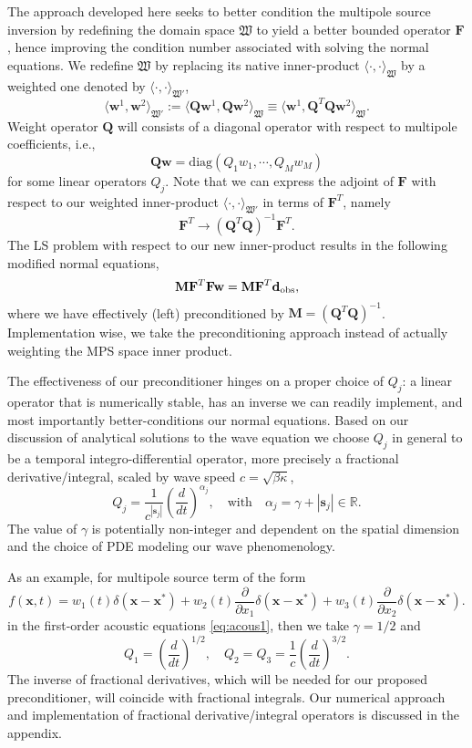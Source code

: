 The approach developed here seeks to better condition the multipole source inversion by redefining the domain space $\mathfrak W$ to yield a better bounded operator $\mathbf F$, hence improving the condition number associated with solving the normal equations.
We redefine $\mathfrak W$ by replacing its native inner-product $\langle\cdot,\cdot\rangle_{\mathfrak W}$ by a weighted one denoted by $\langle\cdot,\cdot\rangle_{\mathfrak W'}$,
\[
	\langle \mathbf w^1, \mathbf w^2 \rangle_{\mathfrak W'} := \langle \mathbf Q\mathbf w^1, \mathbf Q \mathbf w^2 \rangle_{\mathfrak W} \equiv \langle \mathbf w^1, \mathbf Q^T\mathbf Q \mathbf w^2 \rangle_{\mathfrak W}.
\] 
Weight operator $\mathbf Q$ will consists of a diagonal operator with respect to multipole coefficients, i.e.,
\[
	\mathbf Q \mathbf w = \text{diag}(Q_1 w_1, \cdots, Q_M w_M)
\]
for some linear operators $Q_j$.
Note that we can express the adjoint of $\mathbf F$ with respect to our weighted inner-product $\langle\cdot,\cdot\rangle_{\mathfrak W'}$ in terms of $\mathbf F^T$, namely
\[
	\mathbf F^T \to (\mathbf Q^T\mathbf Q)^{-1} \mathbf F^T.
\]
The LS problem with respect to our new inner-product results in the following modified normal equations,
\begin{equation}\label{eq:PNEQ}
	\mathbf M\mathbf F^T\mathbf F \mathbf w = \mathbf M\mathbf F^T \mathbf d_{\rm obs},
\end{equation}
where we have effectively (left) preconditioned by $\mathbf M = (\mathbf Q^T\mathbf Q)^{-1}$.
Implementation wise, we take the preconditioning approach instead of actually weighting the MPS space inner product.

The effectiveness of our preconditioner hinges on a proper choice of $Q_j$: a linear operator that is numerically stable, has an inverse we can readily implement, and most importantly better-conditions our normal equations.
Based on our discussion of analytical solutions to the wave equation we choose $Q_j$ in general to be a temporal integro-differential operator, more precisely a fractional derivative/integral, scaled by wave speed $c=\sqrt{\beta\kappa}$,
\[
	Q_j = \frac{1}{c^{|\mathbf s_j|}} \left( \frac{d}{d t} \right)^{\alpha_j}, \quad \text{with} \quad \alpha_j = \gamma + |\mathbf s_j| \in\mathbb R.
\]
The value of $\gamma$ is potentially non-integer and dependent on the spatial dimension and the choice of PDE modeling our wave phenomenology.

As an example, for multipole source term of the form
\[
	f(\mathbf x,t) = w_1(t) \delta(\mathbf x-\mathbf x^*) + 
			w_2(t) \frac{\partial}{\partial x_1}\delta(\mathbf x-\mathbf x^*) +
			w_3(t) \frac{\partial}{\partial x_2}\delta(\mathbf x-\mathbf x^*).
\]
in the first-order acoustic equations \ref{eq:acous1}, then we take $\gamma=1/2$ and
\[
        Q_1 = \left(\frac{d}{dt}\right)^{1/2}, \quad 
        Q_2 = Q_3 = \frac{1}{c} \left(\frac{d}{d t}\right)^{3/2}.       
\]
The inverse of fractional derivatives, which will be needed for our proposed preconditioner, will coincide with fractional integrals.
Our numerical approach and implementation of fractional derivative/integral operators is discussed in the appendix.


